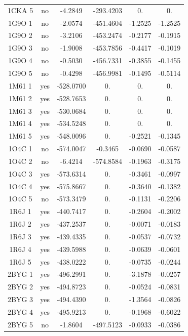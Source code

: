 \begin{table}[h]
\begin{tabular}{|c|c|c|c|c|c|}
        1CKA 5 & no   &  -4.2849   & -293.4203 & 0. & 0. \\           
        1G9O 1 & no   &  -2.0574   & -451.4604 & -1.2525 & -1.2525 \\ 
        1G9O 2 & no   &  -3.2106   & -453.2474 & -0.2177 & -0.1915 \\ 
        1G9O 3 & no   &  -1.9008   & -453.7856 & -0.4417 & -0.1019 \\ 
        1G9O 4 & no   &  -0.5030   & -456.7331 & -0.3855 & -0.1455 \\ 
        1G9O 5 & no   &  -0.4298   & -456.9981 & -0.1495 & -0.5114 \\ 
        1M61 1 & yes  & -528.0700 & 0. & 0. & 0. \\               
        1M61 2 & yes  & -528.7653 & 0. & 0. & 0. \\               
        1M61 3 & yes  & -530.0684 & 0. & 0. & 0. \\               
        1M61 4 & yes  & -534.5248 & 0. & 0. & 0.\\               
        1M61 5 & yes  & -548.0096 & 0. & -0.2521 & -0.1345 \\     
        1O4C 1 & no   &  -574.0047 & -0.3465 & -0.0690 & -0.0587 \\    
        1O4C 2 & no   &  -6.4214   & -574.8584 & -0.1963 & -0.3175 \\         
        1O4C 3 & yes  & -573.6314 &  0. & -0.3461 & -0.0997 \\             
        1O4C 4 & yes  & -575.8667 &  0. & -0.3640 & -0.1382 \\             
        1O4C 5 & no   & -573.3479 &  0. & -0.1131 & -0.2206 \\      
        1R6J 1 & yes  & -440.7417 &  0. & -0.2604 & -0.2002 \\        
        1R6J 2 & yes  & -437.2537 &  0. & -0.0071 & -0.0183 \\        
        1R6J 3 & yes  & -439.4335 &  0. & -0.0537 & -0.0732 \\       
        1R6J 4 & yes  & -439.5988 &  0. & -0.0639 & -0.0601 \\        
        1R6J 5 & yes  & -438.0222 &  0. & -0.0735 & -0.0244 \\        
        2BYG 1 & yes  & -496.2991 &  0. & -3.1878 & -0.0257 \\        
        2BYG 2 & yes  & -494.8723 &  0. & -0.0524 & -0.0831 \\        
        2BYG 3 & yes  & -494.4390 &  0. & -1.3564 & -0.0826 \\        
        2BYG 4 & yes  & -495.9213 &  0. & -0.1968 & -0.6022 \\        
        2BYG 5 & no   &  -1.8604   & -497.5123 & -0.0933 & -0.0386 \\   
    
    \hline


 \end{tabular}      
 \label{tab_echec_20}      
\end{table}




